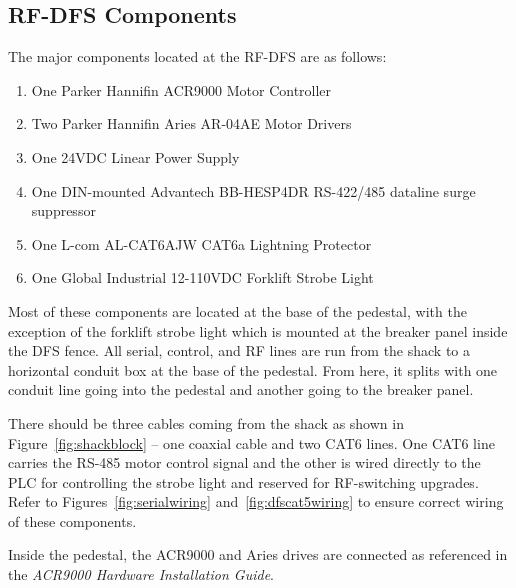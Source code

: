 \documentclass[titlepage]{article}
\begin{document}
\subsection{RF-DFS Components}\label{sec:higdfs}
The major components located at the RF-DFS are as follows:
\begin{enumerate}
  \item One Parker Hannifin ACR9000 Motor Controller
  \item Two Parker Hannifin Aries AR-04AE Motor Drivers
  \item One 24VDC Linear Power Supply
  \item One DIN-mounted Advantech BB-HESP4DR RS-422/485 dataline surge suppressor
  \item One L-com AL-CAT6AJW CAT6a Lightning Protector
  \item One Global Industrial 12-110VDC Forklift Strobe Light
\end{enumerate}
Most of these components are located at the base of the pedestal, with the exception of the forklift strobe light which is mounted at the breaker panel inside the DFS fence. All serial, control, and RF lines are run from the shack to a horizontal conduit box at the base of the pedestal. From here, it splits with one conduit line going into the pedestal and another going to the breaker panel.

There should be three cables coming from the shack as shown in Figure~\ref{fig:shackblock} -- one coaxial cable and two CAT6 lines. One CAT6 line carries the RS-485 motor control signal and the other is wired directly to the PLC for controlling the strobe light and reserved for RF-switching upgrades. Refer to Figures~\ref{fig:serialwiring} and~\ref{fig:dfscat5wiring} to ensure correct wiring of these components.

Inside the pedestal, the ACR9000 and Aries drives are connected as referenced in the \textit{ACR9000 Hardware Installation Guide}.
\end{document}
